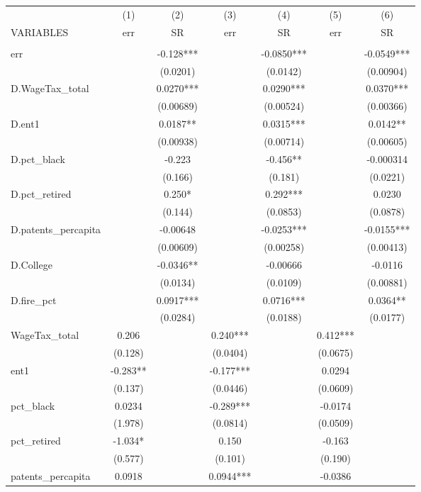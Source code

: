 \begin{tabular}{lcccccc} \hline
 & (1) & (2) & (3) & (4) & (5) & (6) \\
VARIABLES & err & SR & err & SR & err & SR \\ \hline
 &  &  &  &  &  &  \\
err &  & -0.128*** &  & -0.0850*** &  & -0.0549*** \\
 &  & (0.0201) &  & (0.0142) &  & (0.00904) \\
D.WageTax\_total &  & 0.0270*** &  & 0.0290*** &  & 0.0370*** \\
 &  & (0.00689) &  & (0.00524) &  & (0.00366) \\
D.ent1 &  & 0.0187** &  & 0.0315*** &  & 0.0142** \\
 &  & (0.00938) &  & (0.00714) &  & (0.00605) \\
D.pct\_black &  & -0.223 &  & -0.456** &  & -0.000314 \\
 &  & (0.166) &  & (0.181) &  & (0.0221) \\
D.pct\_retired &  & 0.250* &  & 0.292*** &  & 0.0230 \\
 &  & (0.144) &  & (0.0853) &  & (0.0878) \\
D.patents\_percapita &  & -0.00648 &  & -0.0253*** &  & -0.0155*** \\
 &  & (0.00609) &  & (0.00258) &  & (0.00413) \\
D.College &  & -0.0346** &  & -0.00666 &  & -0.0116 \\
 &  & (0.0134) &  & (0.0109) &  & (0.00881) \\
D.fire\_pct &  & 0.0917*** &  & 0.0716*** &  & 0.0364** \\
 &  & (0.0284) &  & (0.0188) &  & (0.0177) \\
WageTax\_total & 0.206 &  & 0.240*** &  & 0.412*** &  \\
 & (0.128) &  & (0.0404) &  & (0.0675) &  \\
ent1 & -0.283** &  & -0.177*** &  & 0.0294 &  \\
 & (0.137) &  & (0.0446) &  & (0.0609) &  \\
pct\_black & 0.0234 &  & -0.289*** &  & -0.0174 &  \\
 & (1.978) &  & (0.0814) &  & (0.0509) &  \\
pct\_retired & -1.034* &  & 0.150 &  & -0.163 &  \\
 & (0.577) &  & (0.101) &  & (0.190) &  \\
patents\_percapita & 0.0918 &  & 0.0944*** &  & -0.0386 &  \\

\end{tabular}
